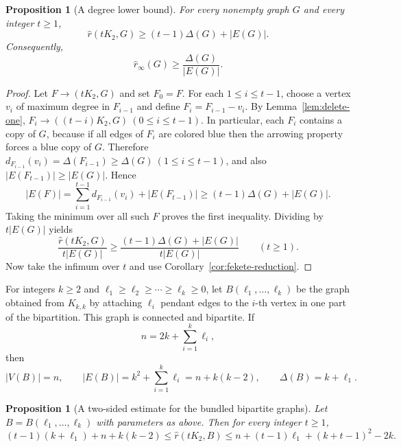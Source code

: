 \documentclass[11pt]{article}
\newcommand{\sr}{\hat r}
\newcommand{\sri}{\hat r_{\infty}}
\newtheorem{proposition}[theorem]{Proposition}
\theoremstyle{definition}
\theoremstyle{remark}
\begin{document}
\begin{proposition}[A degree lower bound]\label{prop:delta-lower}
For every nonempty graph $G$ and every integer $t\ge 1$,
\[
\sr(tK_2,G)\ge (t-1)\Delta(G)+|E(G)|.
\]
Consequently,
\[
\sri(G)\ge \frac{\Delta(G)}{|E(G)|}.
\]
\end{proposition}

\begin{proof}
Let $F\to(tK_2,G)$ and set $F_0=F$. For each $1\le i\le t-1$, choose a vertex $v_i$ of
maximum degree in $F_{i-1}$ and define
$F_i=F_{i-1}-v_i$.
By Lemma~\ref{lem:delete-one},
$F_i\to((t-i)K_2,G)
~ (0\le i\le t-1)$.
In particular, each $F_i$ contains a copy of $G$, because if all edges of $F_i$ are colored
blue then the arrowing property forces a blue copy of $G$. Therefore
$d_{F_{i-1}}(v_i)=\Delta(F_{i-1})\ge \Delta(G)
~ (1\le i\le t-1)$,
and also $|E(F_{t-1})|\ge |E(G)|$. Hence
\[
|E(F)|=
\sum_{i=1}^{t-1}d_{F_{i-1}}(v_i)+|E(F_{t-1})|
\ge (t-1)\Delta(G)+|E(G)|.
\]
Taking the minimum over all such $F$ proves the first inequality. Dividing by
$t|E(G)|$ yields
\[
\frac{\sr(tK_2,G)}{t|E(G)|}
\ge
\frac{(t-1)\Delta(G)+|E(G)|}{t|E(G)|}
\qquad (t\ge 1).
\]
Now take the infimum over $t$ and use Corollary~\ref{cor:fekete-reduction}.
\end{proof}

For integers $k\ge 2$ and
$\ell_1\ge \ell_2\ge \cdots\ge \ell_k\ge 0$,
let $B(\ell_1,\dots,\ell_k)$ be the graph obtained from $K_{k,k}$ by attaching $\ell_i$
pendant edges to the $i$-th vertex in one part of the bipartition. This graph is connected and
bipartite. If
\[
n=2k+\sum_{i=1}^k\ell_i,
\]
then
\begin{equation}\label{eq:basic-params}
|V(B)|=n,
\qquad
|E(B)|=k^2+\sum_{i=1}^k\ell_i=n+k(k-2),
\qquad
\Delta(B)=k+\ell_1.
\end{equation}

\begin{proposition}[A two-sided estimate for the bundled bipartite graphs]
\label{prop:bundle-bounds}
Let $B=B(\ell_1,\dots,\ell_k)$ with parameters as above. Then for every integer $t\ge 1$,
\[
(t-1)(k+\ell_1)+n+k(k-2)
\le
\sr(tK_2,B)
\le
n+(t-1)\ell_1+(k+t-1)^2-2k.
\]
\end{proposition}
\end{document}
